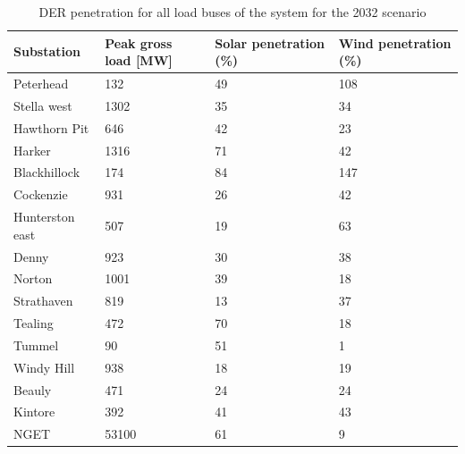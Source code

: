 \begin{table}
\centering
\caption{DER penetration for all load buses of the system for the 2032 scenario}
\label{tab:der_penetration}
\begin{tabular}{@{}llll@{}}
\toprule
Substation      & Peak gross load [MW] & Solar penetration (\%) & Wind penetration (\%) \\ \midrule
Peterhead       & 132                  & 49                    & 108                  \\
Stella west     & 1302                 & 35                    & 34                   \\
Hawthorn Pit    & 646                  & 42                    & 23                   \\
Harker          & 1316                 & 71                    & 42                   \\
Blackhillock    & 174                  & 84                    & 147                  \\
Cockenzie       & 931                  & 26                    & 42                   \\
Hunterston east & 507                  & 19                    & 63                   \\
Denny           & 923                  & 30                    & 38                   \\
Norton          & 1001                 & 39                    & 18                   \\
Strathaven      & 819                  & 13                    & 37                   \\
Tealing         & 472                  & 70                    & 18                   \\
Tummel          & 90                   & 51                    & 1                    \\
Windy Hill      & 938                  & 18                    & 19                   \\
Beauly          & 471                  & 24                    & 24                   \\
Kintore         & 392                  & 41                    & 43                   \\
NGET            & 53100                & 61                    & 9                    \\ \bottomrule
\end{tabular}
\end{table}

